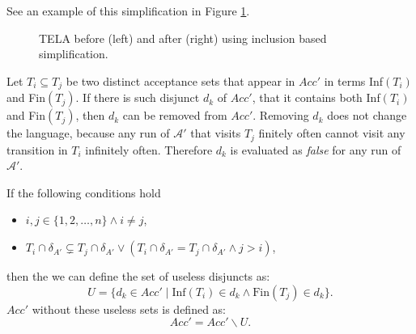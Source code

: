 \documentclass[
  digital, %
  twoside, %
  table,   %
  lof,     %
  lot,     %
]{fithesis3}
\begin{document}
See an example of this simplification in Figure \ref{fig:inclusion_fins}.

\begin{figure}[h]
  \centering
  \caption{TELA before (left) and after (right) using inclusion based simplification.}
  \label{fig:inclusion_fins}
\end{figure}

Let $T_i \subseteq T_j$ be two distinct acceptance sets that appear in $Acc'$ in terms Inf$(T_i)$ and Fin$(T_j)$. If there is such disjunct $d_k$ of $Acc'$, that it contains both Inf$(T_i)$ and Fin$(T_j)$, then $d_k$ can be removed from $Acc'$. Removing $d_k$ does not change the language, because any run of $\mathcal{A'}$ that visits $T_j$ finitely often cannot visit any transition in $T_i$ infinitely often. Therefore $d_k$ is evaluated as \emph{false} for any run of $\mathcal{A'}$. 

If the following conditions hold
\begin{itemize}
  \item $i, j \in \{1, 2, \dots, n\} \wedge i \neq j$,
  \item $T_i \cap \delta_{A'} \subsetneq T_j \cap \delta_{A'} \vee (T_i \cap \delta_{A'} = T_j \cap \delta_{A'} \wedge j > i)$,
\end{itemize}
then the we can define the set of useless disjuncts as:
\begin{equation*}
  U = \{d_k \in Acc' \mid \text{Inf}(T_i) \in d_k \wedge \text{Fin}(T_j) \in d_k \}.
\end{equation*}
$Acc'$ without these useless sets is defined as:
\begin{equation*}
  Acc' = Acc' \smallsetminus U.
\end{equation*}
\end{document}
